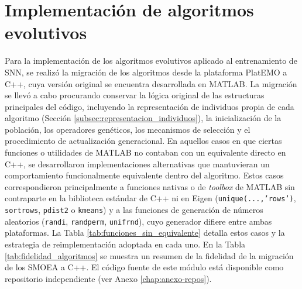 

\section{Implementación de algoritmos evolutivos}\label{sec:algoritmos-evolutivos}
Para la implementación de los algoritmos evolutivos aplicado al entrenamiento de SNN, se realizó la migración de los algoritmos desde la plataforma PlatEMO \cite{8065138_platEMO} a C++, cuya versión original se encuentra desarrollada en MATLAB. La migración se llevó a cabo procurando conservar la lógica original de las estructuras principales del código, incluyendo la representación de individuos propia de cada algoritmo (Sección \ref{subsec:representacion_individuos}), la inicialización de la población, los operadores genéticos, los mecanismos de selección y el procedimiento de actualización generacional. En aquellos casos en que ciertas funciones o utilidades de MATLAB no contaban con un equivalente directo en C++, se desarrollaron implementaciones alternativas que mantuvieran un comportamiento funcionalmente equivalente dentro del algoritmo. Estos casos correspondieron principalmente a funciones nativas o de \textit{toolbox} de MATLAB sin contraparte en la biblioteca estándar de C++ ni en Eigen (\texttt{unique(...,'rows')}, \texttt{sortrows}, \texttt{pdist2} o \texttt{kmeans}) y a las funciones de generación de números aleatorios (\texttt{randi}, \texttt{randperm}, \texttt{unifrnd}), cuyo generador difiere entre ambas plataformas. La Tabla \ref{tab:funciones_sin_equivalente} detalla estos casos y la estrategia de reimplementación adoptada en cada uno. En la Tabla \ref{tab:fidelidad_algoritmos} se muestra un resumen de la fidelidad de la migración de los SMOEA a C++. El código fuente de este módulo está disponible como repositorio independiente (ver Anexo \ref{chap:anexo-repos}).

